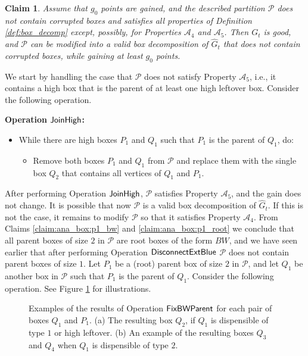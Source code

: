 \documentclass[11pt]{article}
\def\Proof{\par\noindent{\bf Proof:~}}
\def\dnsitem{\vspace{-7pt}\item}
\newtheorem{claim}[theorem]{Claim}
\theoremstyle{definition}
\def\decompsize{\mathcal{A}_4}
\def\decompcleanl{\mathcal{A}_5}
\def\joinhigh{\mbox{\sf JoinHigh}}
\def\discblue{\mbox{\sf DisconnectExtBlue}}
\def\fixbwparent{\mbox{\sf FixBWParent}}
\begin{document}
\begin{claim}
\label{claim:ana_box:fix_p}
Assume that $g_0$ points are gained, and the described partition $\mathcal{P}$ 
does not contain corrupted boxes and satisfies all properties of Definition \ref{def:box_decomp} except, possibly, for Properties $\decompsize$ and $\decompcleanl$.
Then $G_t$ is good, and $\mathcal{P}$ can be modified into a valid box decomposition of $\hat{G}_t$ that does not contain corrupted boxes, while gaining at least $g_0$ points.
\end{claim}
\Proof
We start by handling the case that $\mathcal{P}$ does not satisfy Property $\decompcleanl$, i.e., it contains a high box that is the parent of at least one high leftover box.
Consider the following operation.
\smallskip
\par\noindent
{\bf Operation $\joinhigh$:}
\begin{itemize}
\dnsitem[] While there are high boxes $P_1$ and $Q_1$ such that $P_1$ is the parent of $Q_1$, do:
	\begin{itemize}
		\dnsitem[] Remove both boxes $P_1$ and $Q_1$ from $\mathcal{P}$ and replace them with the single box $Q_2$ that contains all vertices of $Q_1$ and $P_1$.
	\end{itemize}
\end{itemize}
\bigskip
After performing Operation $\joinhigh$, $\mathcal{P}$ satisfies Property $\decompcleanl$, and the gain does not change.
It is possible that now $\mathcal{P}$ is a valid box decomposition of $\hat{G}_t$.
If this is not the case, it remains to modify $\mathcal{P}$ so that it satisfies Property $\decompsize$.
From Claims \ref{claim:ana_box:p1_bw} and \ref{claim:ana_box:p1_root} we conclude that all parent boxes of size $2$ in $\mathcal{P}$ are root boxes of the form $BW$, and we have seen earlier that after performing Operation $\discblue$ $\mathcal{P}$ does not contain parent boxes of size $1$.
Let $P_1$ be a (root) parent box of size $2$ in $\mathcal{P}$, and let $Q_1$ be another box in $\mathcal{P}$ such that $P_1$ is the parent of $Q_1$.
Consider the following operation. See Figure \ref{fig:ana_box_to_graph} for illustrations.

\begin{figure}[thbp]
  \caption{\sf Examples of the results of Operation $\fixbwparent$ for each pair of boxes $Q_1$ and $P_1$.
		(a) The resulting box $Q_2$, if $Q_1$ is dispensible of type $1$ or high leftover.
		(b) An example of the resulting boxes $Q_3$ and $Q_4$ when $Q_1$ is dispensible of type $2$.}
  \medskip
  \centering
  \label{fig:ana_box_to_graph}
\end{figure}		
\end{document}
